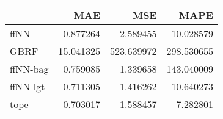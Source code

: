\begin{tabular}{lrrr}
\toprule
{} &        MAE &         MSE &        MAPE \\
\midrule
ffNN     &   0.877264 &    2.589455 &   10.028579 \\
GBRF     &  15.041325 &  523.639972 &  298.530655 \\
ffNN-bag &   0.759085 &    1.339658 &  143.040009 \\
ffNN-lgt &   0.711305 &    1.416262 &   10.640273 \\
tope     &   0.703017 &    1.588457 &    7.282801 \\
\bottomrule
\end{tabular}
